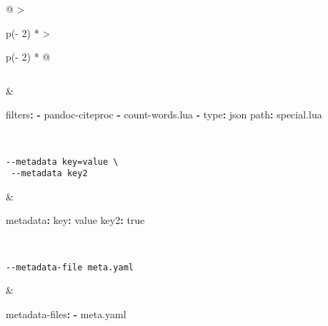 \documentclass[
  a4paper,
]{article}
\newenvironment{Shaded}{}{}
\newcommand{\AttributeTok}[1]{\textcolor[rgb]{0.49,0.56,0.16}{#1}}
\newcommand{\CharTok}[1]{\textcolor[rgb]{0.25,0.44,0.63}{#1}}
\newcommand{\FunctionTok}[1]{\textcolor[rgb]{0.02,0.16,0.49}{#1}}
\newcommand{\KeywordTok}[1]{\textcolor[rgb]{0.00,0.44,0.13}{\textbf{#1}}}
\begin{document}
\begin{longtable}[]{@{}
  >{\raggedright\arraybackslash}p{(\columnwidth - 2\tabcolsep) * }
  >{\raggedright\arraybackslash}p{(\columnwidth - 2\tabcolsep) * }@{}}
\begin{minipage}[t]{\linewidth}
\begin{verbatim}
\end{verbatim}
\end{minipage} & \begin{minipage}[t]{\linewidth}\raggedright
\begin{Shaded}
\begin{Highlighting}[]
\FunctionTok{filters}\KeywordTok{:}
\AttributeTok{  }\KeywordTok{{-}}\AttributeTok{ pandoc{-}citeproc}
\AttributeTok{  }\KeywordTok{{-}}\AttributeTok{ count{-}words.lua}
\AttributeTok{  }\KeywordTok{{-}}\AttributeTok{ }\FunctionTok{type}\KeywordTok{:}\AttributeTok{ json}
\AttributeTok{    }\FunctionTok{path}\KeywordTok{:}\AttributeTok{ special.lua}
\end{Highlighting}
\end{Shaded}
\end{minipage} \\
\begin{minipage}[t]{\linewidth}\raggedright
\begin{verbatim}
--metadata key=value \
 --metadata key2
\end{verbatim}
\end{minipage} & \begin{minipage}[t]{\linewidth}\raggedright
\begin{Shaded}
\begin{Highlighting}[]
\FunctionTok{metadata}\KeywordTok{:}
\AttributeTok{  }\FunctionTok{key}\KeywordTok{:}\AttributeTok{ value}
\AttributeTok{  }\FunctionTok{key2}\KeywordTok{:}\AttributeTok{ }\CharTok{true}
\end{Highlighting}
\end{Shaded}
\end{minipage} \\
\begin{minipage}[t]{\linewidth}\raggedright
\begin{verbatim}
--metadata-file meta.yaml
\end{verbatim}
\end{minipage} & \begin{minipage}[t]{\linewidth}\raggedright
\begin{Shaded}
\begin{Highlighting}[]
\FunctionTok{metadata{-}files}\KeywordTok{:}
\AttributeTok{  }\KeywordTok{{-}}\AttributeTok{ meta.yaml}
\end{Highlighting}
\end{Shaded}


\end{minipage}
\end{longtable}
\end{document}
